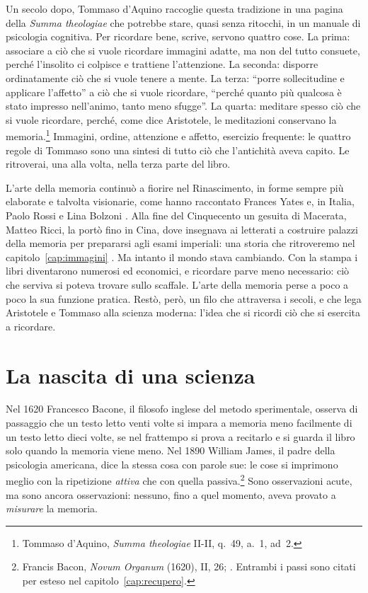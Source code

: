 Un secolo dopo, Tommaso d'Aquino raccoglie questa tradizione in una
pagina della \emph{Summa theologiae} che potrebbe stare, quasi senza
ritocchi, in un manuale di psicologia cognitiva. Per ricordare bene,
scrive, servono quattro cose. La prima: associare a ciò che si vuole
ricordare immagini adatte, ma non del tutto consuete, perché l'insolito
ci colpisce e trattiene l'attenzione. La seconda: disporre ordinatamente
ciò che si vuole tenere a mente. La terza: \enquote{porre sollecitudine
e applicare l'affetto} a ciò che si vuole ricordare, \enquote{perché
quanto più qualcosa è stato impresso nell'animo, tanto meno sfugge}. La
quarta: meditare spesso ciò che si vuole ricordare, perché, come dice
Aristotele, le meditazioni conservano la memoria.\footnote{Tommaso
d'Aquino, \emph{Summa theologiae} II-II, q.~49, a.~1, ad~2.} Immagini,
ordine, attenzione e affetto, esercizio frequente: le quattro regole di
Tommaso sono una sintesi di tutto ciò che l'antichità aveva capito. Le
ritroverai, una alla volta, nella terza parte del libro.

L'arte della memoria continuò a fiorire nel Rinascimento, in forme
sempre più elaborate e talvolta visionarie, come hanno raccontato
Frances Yates e, in Italia, Paolo Rossi e Lina Bolzoni
\parencite{yates1966, rossi1960, bolzoni1995}. Alla fine del
Cinquecento un gesuita di Macerata, Matteo Ricci, la portò fino in
Cina, dove insegnava ai letterati a costruire palazzi della memoria per
prepararsi agli esami imperiali: una storia che ritroveremo nel
capitolo~\ref{cap:immagini} \parencite{spence1984}. Ma intanto il mondo
stava cambiando. Con la stampa i libri diventarono numerosi ed economici,
e ricordare parve meno necessario: ciò che serviva si poteva trovare
sullo scaffale. L'arte della memoria perse a poco a poco la sua
funzione pratica. Restò, però, un filo che attraversa i secoli, e che
lega Aristotele e Tommaso alla scienza moderna: l'idea che si ricordi
ciò che si esercita a ricordare.

\section{La nascita di una scienza}

Nel 1620 Francesco Bacone, il filosofo inglese del metodo sperimentale,
osserva di passaggio che un testo letto venti volte si impara a memoria
meno facilmente di un testo letto dieci volte, se nel frattempo si
prova a recitarlo e si guarda il libro solo quando la memoria viene
meno. Nel 1890 William James, il padre della psicologia americana,
dice la stessa cosa con parole sue: le cose si imprimono meglio con la
ripetizione \emph{attiva} che con quella passiva.\footnote{Francis
Bacon, \emph{Novum Organum} (1620), II, 26; \textcite[686]{james1890}.
Entrambi i passi sono citati per esteso nel
capitolo~\ref{cap:recupero}.} Sono osservazioni acute, ma sono ancora
osservazioni: nessuno, fino a quel momento, aveva provato a
\emph{misurare} la memoria.

